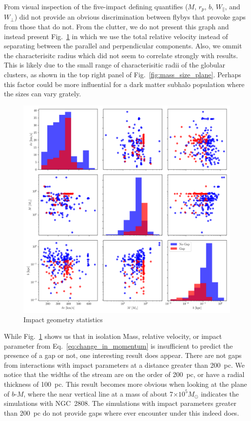 \documentclass{aa}
\begin{document}
\begin{appendix}
      From visual inspection of the five-impact defining quantifies ($M$, $r_p$, $b$, $W_\parallel$, and $W_\perp$) did not provide an obvious discrimination between flybys that provoke gaps from those that do not. From the clutter, we do not present this graph and instead present Fig.~\ref{fig:impact_geometry_statistics} in which we use the total relative velocity instead of separating between the parallel and perpendicular components. Also, we ommit the characterisitc radius which did not seem to correlate strongly with results. This is likely due to the small range of characterisitic radii of the globular clusters, as shown in the top right panel of Fig.~\ref{fig:mass_size_plane}. Perhaps this factor could be more influential for a dark matter subhalo population where the sizes can vary grately.
      \begin{figure}
        \centering
        \includegraphics[width=\linewidth]{impact_geometry_statistics.png}
        \caption{Impact geometry statistics}
        \label{fig:impact_geometry_statistics}    
        \end{figure}
      While Fig.~\ref{fig:impact_geometry_statistics} shows us that in isolation Mass, relative velocity, or impact parameter from Eq.~\ref{eq:change_in_momentum} is insufficient to predict the presence of a gap or not, one interesting result does appear. There are not gaps from interactions with impact parameters at a distance greater than 200~pc. We notice that the widths of the stream are on the order of 200~pc, or have a radial thickness of 100~pc. This result becomes more obvious when looking at the plane of $b$-$M$, where the near vertical line at a mass of about 7$\times 10^5 M_\odot$ indicates the simulations with NGC~2808. The simulations with impact parameters greater than 200~pc do not provide gaps where ever encounter under this indeed does. 



\end{appendix}
\end{document}
